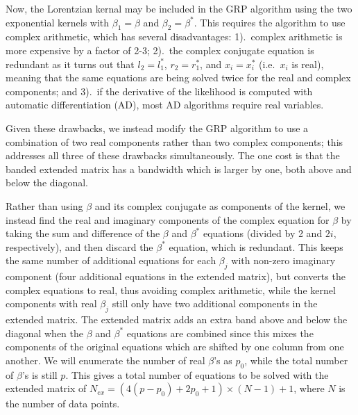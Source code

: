 \documentclass[manuscript, letterpaper]{aastex6}
\begin{document}
Now, the Lorentzian kernal may be included in the GRP algorithm 
using the two exponential kernels with $\beta_1 = \beta$ and $\beta_2 = \beta^*$.  This 
requires the algorithm to use complex arithmetic, which has several disadvantages:
1).\ complex arithmetic is more expensive by a factor of 2-3; 2).\ the complex conjugate equation
is redundant as it turns out that $l_2 = l_1^*$, $r_2 = r_1^*$, and $x_i = x_i^*$ (i.e.\ $x_i$ is
real), meaning that the same equations are being solved twice for the real and complex components; 
and 3).\ if the derivative of the likelihood is computed with automatic
differentiation (AD), most AD algorithms require real variables.

Given these drawbacks, we instead modify the GRP algorithm to use a combination of two real
components rather than two complex components;  this addresses all three of these drawbacks
simultaneously.  The one cost is that the banded extended matrix has a bandwidth which is
larger by one, both above and below the diagonal.

Rather than using $\beta$ and its complex conjugate as components of the kernel, we instead
find the real and imaginary components of the complex equation for $\beta$ by taking the
sum and difference of the $\beta$ and $\beta^*$ equations (divided by 2 and $2i$, respectively), 
and then discard the $\beta^*$ equation, which is redundant.  This keeps the same number of
additional equations for each $\beta_j$ with non-zero imaginary component (four additional
equations in the extended matrix), but converts the complex equations to real, thus avoiding
complex arithmetic, while the kernel components with real $\beta_j$ still only have two 
additional components in the extended matrix.  The extended matrix adds an extra band above
and below the diagonal when the $\beta$ and $\beta^*$ equations are combined since this
mixes the components of the original equations which are shifted by one column from one
another.  We will enumerate the number of real $\beta$'s as $p_0$, while the total number 
of $\beta$'s is still $p$.  This gives a total number of equations to be solved with the 
extended matrix of $N_{ex}= (4(p-p_0)+2p_0+1)\times(N-1)+1$, where $N$ is the number of data 
points.  
\end{document}
